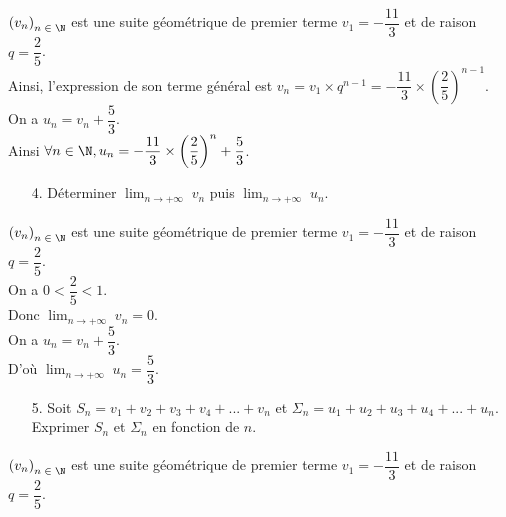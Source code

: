 $\left(v_n\right)_{n \; \in \; \N}$ est une suite géométrique de premier terme $v_1 =-\dfrac{11}{3}$ et de raison $q =\dfrac{2}{5}$. \\

Ainsi, l'expression de son terme général est $v_n = v_1 \times q^{n-1} = -\dfrac{11}{3} \times \left(\dfrac{2}{5}\right)^{n-1} $. \\

On a $u_n = v_n + \dfrac{5}{3}$. \\

Ainsi $\forall n \in \N, u_n = -\dfrac{11}{3} \times \left(\dfrac{2}{5}\right)^n + \dfrac{5}{3}$. 

\vspace*{-5cm}

\newpage

\vspace*{-1cm}

\begin{itemize}
\item[4.] Déterminer $ \displaystyle {\lim_{n \rightarrow +\infty}} \; v_n$ puis $ \displaystyle {\lim_{n \rightarrow +\infty}} \; u_n$. \\
\end{itemize}

$\left(v_n\right)_{n \; \in \; \N}$ est une suite géométrique de premier terme $v_1 =-\dfrac{11}{3}$ et de raison $q =\dfrac{2}{5}$. \\

On a $0 < \dfrac{2}{5} < 1$. \\

Donc $ \displaystyle {\lim_{n \rightarrow +\infty}} \; v_n = 0$. \\

On a $u_n = v_n + \dfrac{5}{3}$. \\

D'où $ \displaystyle {\lim_{n \rightarrow +\infty}} \; u_n = \dfrac{5}{3}$. \\

\begin{itemize}
\item[5.] Soit $S_n = v_1 + v_2 + v_3 + v_4 + ... + v_n$ et $\Sigma_n = u_1 + u_2 + u_3 + u_4 + ... + u_n$. \\ Exprimer $S_n$ et $\Sigma_n$ en fonction de $n$. \\
\end{itemize}

$\left(v_n\right)_{n \; \in \; \N}$ est une suite géométrique de premier terme $v_1 = -\dfrac{11}{3} $ et de raison $q = \dfrac{2}{5}$. \\

